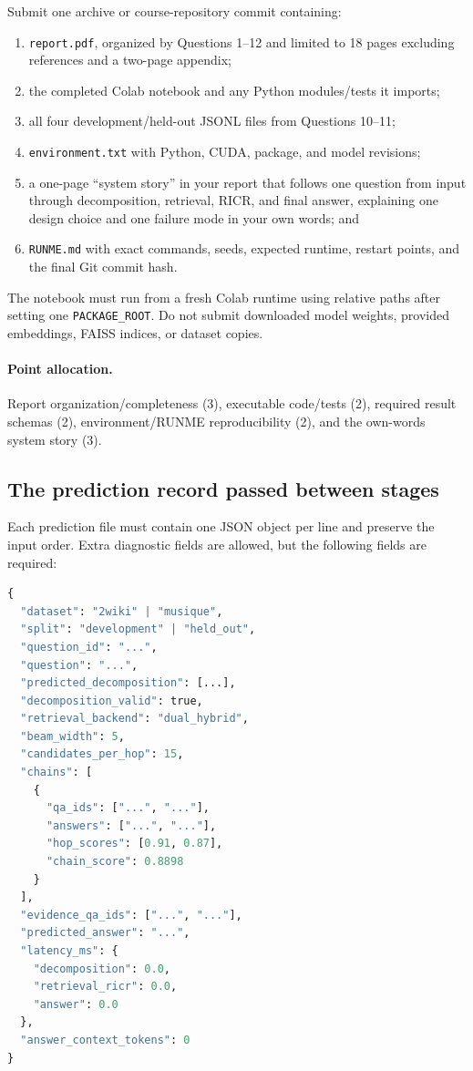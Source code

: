\documentclass[11pt]{article}
\newcommand{\code}[1]{\texttt{#1}}
\newcommand{\RICR}{{\mdseries\textsc{RICR}}\xspace}
\newcommand{\grading}{\paragraph{Point allocation.}}
\begin{document}
Submit one archive or course-repository commit containing:

\begin{enumerate}[label=(\alph*)]
  \item \code{report.pdf}, organized by Questions 1--12 and limited to 18 pages
        excluding references and a two-page appendix;
  \item the completed Colab notebook and any Python modules/tests it imports;
  \item all four development/held-out JSONL files from Questions 10--11;
  \item \code{environment.txt} with Python, CUDA, package, and model revisions;
  \item a one-page ``system story'' in your report that follows one question
        from input through decomposition, retrieval, \RICR, and final answer,
        explaining one design choice and one failure mode in your own words;
        and
  \item \code{RUNME.md} with exact commands, seeds, expected runtime, restart
        points, and the final Git commit hash.
\end{enumerate}

The notebook must run from a fresh Colab runtime using relative paths after
setting one \code{PACKAGE\_ROOT}. Do not submit downloaded model weights,
provided embeddings, FAISS indices, or dataset copies.

\grading Report organization/completeness (3), executable code/tests (2),
required result schemas (2), environment/RUNME reproducibility (2), and the
own-words system story (3).

\subsection{The prediction record passed between stages}

Each prediction file must contain one JSON object per line and preserve the
input order. Extra diagnostic fields are allowed, but the following fields are
required:

\begin{lstlisting}[language=Python]
{
  "dataset": "2wiki" | "musique",
  "split": "development" | "held_out",
  "question_id": "...",
  "question": "...",
  "predicted_decomposition": [...],
  "decomposition_valid": true,
  "retrieval_backend": "dual_hybrid",
  "beam_width": 5,
  "candidates_per_hop": 15,
  "chains": [
    {
      "qa_ids": ["...", "..."],
      "answers": ["...", "..."],
      "hop_scores": [0.91, 0.87],
      "chain_score": 0.8898
    }
  ],
  "evidence_qa_ids": ["...", "..."],
  "predicted_answer": "...",
  "latency_ms": {
    "decomposition": 0.0,
    "retrieval_ricr": 0.0,
    "answer": 0.0
  },
  "answer_context_tokens": 0
}
\end{lstlisting}
\end{document}
